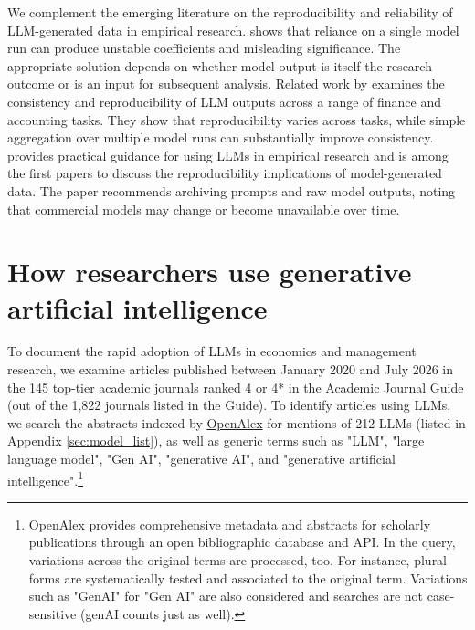 \documentclass[11pt]{article}
\begin{document}

We complement the emerging literature on the reproducibility and reliability of LLM-generated data in empirical research. \citet{kim2026} shows that reliance on a single model run can produce unstable coefficients and misleading significance. The appropriate solution depends on whether model output is itself the research outcome or is an input for subsequent analysis. Related work by \citet{wang2025assessing} examines the consistency and reproducibility of LLM outputs across a range of finance and accounting tasks. They show that reproducibility varies across tasks, while simple aggregation over multiple model runs can substantially improve consistency. \citet{deKokMS2025} provides practical guidance for using LLMs in empirical research and is among the first papers to discuss the reproducibility implications of model-generated data. The paper recommends archiving prompts and raw model outputs, noting that commercial models may change or become unavailable over time.\medskip 

\section{How researchers use generative artificial intelligence}
\label{sec:researcher_use}

To document the rapid adoption of LLMs in economics and management research, we examine articles published between January 2020 and July 2026 in the 145 top-tier academic journals ranked 4 or 4* in the \href{https://charteredabs.org/academic-journal-guide}{Academic Journal Guide} (out of the 1,822 journals listed in the Guide). To identify articles using LLMs, we search the abstracts indexed by \href{https://www.openalex.org}{OpenAlex} for mentions of 212 LLMs (listed in Appendix \ref{sec:model_list}), as well as generic terms such as "LLM", "large language model", "Gen AI", "generative AI", and "generative artificial intelligence".\footnote{OpenAlex provides comprehensive metadata and abstracts for scholarly publications through an open bibliographic database and API. In the query, variations across the original terms are processed, too. For instance, plural forms are systematically tested and associated to the original term. Variations such as "GenAI" for "Gen AI" are also considered and searches are not case-sensitive (genAI counts just as well).}\medskip
\end{document}
